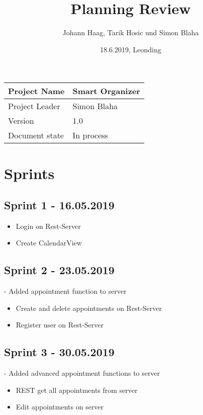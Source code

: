 \documentclass[12pt]{scrartcl}
\title{Planning Review}
\author{Johann Haag, Tarik Hosic und Simon Blaha}
\date{18.6.2019, Leonding}
\begin{document}
    \maketitle
    \begin{flushleft}
    \begin{tabular}{|l|l|}
    \hline
    Project Name & Smart Organizer \\ \hline
    Project Leader & Simon Blaha \\ \hline
    Version & 1.0\\ \hline
    Document state & In process \\ \hline
    \end{tabular}
    \end{flushleft}

    \pagebreak
    \tableofcontents
    \pagebreak

    \section{Sprints}
    \subsection{Sprint 1 - 16.05.2019}
    \begin{itemize}
        \item Login on Rest-Server
        \item Create CalendarView
    \end{itemize}

    \subsection{Sprint 2 - 23.05.2019}
    - Added appointment function to server
    \begin{itemize}
        \item Create and delete appointments on Rest-Server
        \item Register user on Rest-Server
    \end{itemize}

    \subsection{Sprint 3 - 30.05.2019}
    - Added advanced appointment functions to server
    \begin{itemize}
        \item REST get all appointments from server
        \item Edit appointments on server
    \end{itemize}
\end{document}
